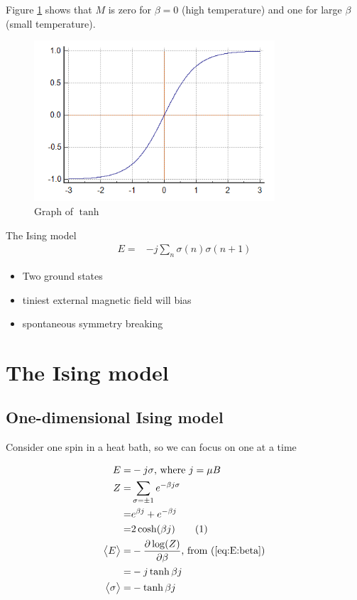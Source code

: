 \documentclass[]{article}
\newcommand\numberthis{\addtocounter{equation}{1}\tag{\theequation}}
\begin{document}
Figure \ref{fig:tanh} shows that $M$ is zero for $\beta=0$ (high temperature) and one for large $\beta$ (small temperature).

\begin{figure}[H]
	\caption{Graph of $\tanh$}\label{fig:tanh}
	\includegraphics[width=0.8\textwidth]{tanh}
\end{figure}

The Ising model
\begin{align*}
E =& - j \sum_{n} \sigma(n) \sigma(n+1)
\end{align*}

\begin{itemize}
	\item Two ground states
	\item tiniest external magnetic field will bias
	\item spontaneous symmetry breaking
\end{itemize}


\section{The Ising model}

\subsection{One-dimensional Ising model}

Consider one spin in a heat bath, so we can focus on one at a time

\begin{align*}
E =& -j \sigma \text{, where $j=\mu B$}\\
Z =& \sum_{\sigma=\pm 1} e^{-\beta j \sigma}\\
=& e^{\beta j}+ e^{- \beta j}\\
=& 2 \cosh(\beta j) \numberthis \label{eq:E:cosh:beta:j}\\
\big<E\big> =& - \frac{\partial \log(Z)}{\partial \beta}\text{, from (\ref{eq:E:beta})}\\
=& - j \tanh{\beta j}\\
\big<\sigma\big> =& - \tanh{\beta j}
\end{align*}
\end{document}
